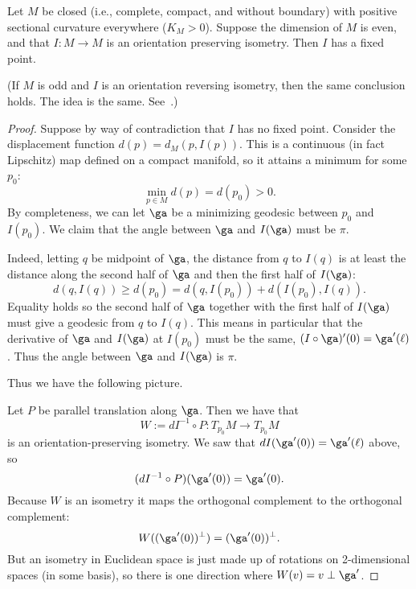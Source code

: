 \begin{thm}
Let $M$ be closed (i.e., complete, compact, and without boundary) with positive sectional curvature everywhere ($K_M>0$). Suppose the dimension of $M$ is even, and that $I:M\to M$ is an orientation preserving isometry. Then $I$ has a fixed point.
\end{thm}
(If $M$ is odd and $I$ is an orientation reversing isometry, then the same conclusion holds. The idea is the same. See~\cite[Theorem 9.3.7]{dC}.)
\begin{proof}

Suppose by way of contradiction that $I$ has no fixed point. Consider the displacement function $d(p)=d_M(p,I(p))$. This is a continuous (in fact Lipschitz) map defined on a compact manifold, so it attains a minimum for some $p_0$: %
\[
\min_{p\in M}d(p)= d(p_0)>0.
\]
By completeness, we can let $\ga$ be a minimizing geodesic between $p_0$ and $I(p_0)$. We claim that the angle between $\ga$ and $I(\ga)$ must be $\pi$.


Indeed, letting $q$ be midpoint of $\ga$, the distance from $q$ to $I(q)$ is at least the distance along the second half of $\ga$ and then the first half of $I(\ga)$:
\[
d(q,I(q))\ge d(p_0)=d(q,I(p_0))+d(I(p_0),I(q)).
\]
Equality holds so the second half of $\ga$ together with the first half of $I(\ga)$ must give a geodesic from $q$ to $I(q)$. This means in particular that the derivative of $\ga$ and $I(\ga)$ at $I(p_0)$ must be the same, $(I\circ \ga)'(0)=\ga'(\ell)$. Thus the angle between $\ga$ and $I(\ga)$ is $\pi$.

%
%

Thus we have the following picture.


Let $P$ be parallel translation along $\ga$. Then we have that
\[
W:=dI^{-1}\circ P:T_{p_0}M\to T_{p_0}M
\]
is an orientation-preserving isometry. We saw that $dI(\ga'(0))=\ga'(\ell)$ above, so %
\[
(dI^{-1} \circ P) (\ga'(0)) =\ga'(0).
\]
Because $W$ is an isometry it maps the orthogonal complement to the orthogonal complement:
\[
W((\ga'(0))^{\perp})=(\ga'(0))^{\perp}.
\]
But an isometry in Euclidean space is just made up of rotations on 2-dimensional spaces (in some basis), so there is one direction where $W(v)=v\perp \ga'$.


\end{proof}

